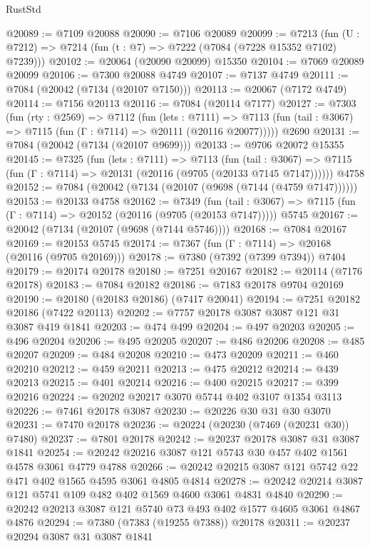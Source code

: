 \begin{lexlean}{RustStd}
\begin{coremodule}
@20089 := @7109 @20088
@20090 := @7106 @20089
@20099 := @7213
    (fun (U : @7212) => @7214 (fun (t : @7) => @7222 (@7084 (@7228 @15352 @7102) @7239)))
@20102 := @20064 (@20090 @20099) @15350
@20104 := @7069 @20089 @20099
@20106 := @7300 @20088 @4749
@20107 := @7137 @4749
@20111 := @7084 (@20042 (@7134 (@20107 @7150)))
@20113 := @20067 (@7172 @4749)
@20114 := @7156 @20113
@20116 := @7084 (@20114 @7177)
@20127 := @7303
    (fun (rty : @2569) =>
    @7112
      (fun (lets : @7111) =>
      @7113 (fun (tail : @3067) => @7115 (fun (Γ : @7114) => @20111 (@20116 @20077)))))
    @2690
@20131 := @7084 (@20042 (@7134 (@20107 @9699)))
@20133 := @9706 @20072 @15355
@20145 := @7325
    (fun (lets : @7111) =>
    @7113
      (fun (tail : @3067) =>
      @7115 (fun (Γ : @7114) => @20131 (@20116 (@9705 (@20133 @7145 @7147))))))
    @4758
@20152 := @7084 (@20042 (@7134 (@20107 (@9698 (@7144 (@4759 @7147))))))
@20153 := @20133 @4758
@20162 := @7349
    (fun (tail : @3067) => @7115 (fun (Γ : @7114) => @20152 (@20116 (@9705 (@20153 @7147)))))
    @5745
@20167 := @20042 (@7134 (@20107 (@9698 (@7144 @5746))))
@20168 := @7084 @20167
@20169 := @20153 @5745
@20174 := @7367 (fun (Γ : @7114) => @20168 (@20116 (@9705 @20169)))
@20178 := @7380 (@7392 (@7399 @7394)) @7404
@20179 := @20174 @20178
@20180 := @7251 @20167
@20182 := @20114 (@7176 @20178)
@20183 := @7084 @20182
@20186 := @7183 @20178 @9704 @20169
@20190 := @20180 (@20183 @20186) (@7417 @20041)
@20194 := @7251 @20182 @20186 (@7422 @20113)
@20202 := @7757 @20178 @3087 @3087 @121 @31 @3087 @419 @1841
@20203 := @474 @499
@20204 := @497 @20203
@20205 := @496 @20204
@20206 := @495 @20205
@20207 := @486 @20206
@20208 := @485 @20207
@20209 := @484 @20208
@20210 := @473 @20209
@20211 := @460 @20210
@20212 := @459 @20211
@20213 := @475 @20212
@20214 := @439 @20213
@20215 := @401 @20214
@20216 := @400 @20215
@20217 := @399 @20216
@20224 := @20202 @20217 @3070 @5744 @402 @3107 @1354 @3113
@20226 := @7461 @20178 @3087
@20230 := @20226 @30 @31 @30 @3070
@20231 := @7470 @20178
@20236 := @20224 (@20230 (@7469 (@20231 @30)) @7480)
@20237 := @7801 @20178
@20242 := @20237 @20178 @3087 @31 @3087 @1841
@20254 := @20242 @20216 @3087 @121 @5743 @30 @457 @402 @1561 @4578 @3061 @4779 @4788
@20266 := @20242 @20215 @3087 @121 @5742 @22 @471 @402 @1565 @4595 @3061 @4805 @4814
@20278 := @20242 @20214 @3087 @121 @5741 @109 @482 @402 @1569 @4600 @3061 @4831 @4840
@20290 := @20242 @20213 @3087 @121 @5740 @73 @493 @402 @1577 @4605 @3061 @4867 @4876
@20294 := @7380 (@7383 (@19255 @7388)) @20178
@20311 := @20237
    @20294
    @3087
    @31
    @3087
    @1841

\end{coremodule}
\end{lexlean}
